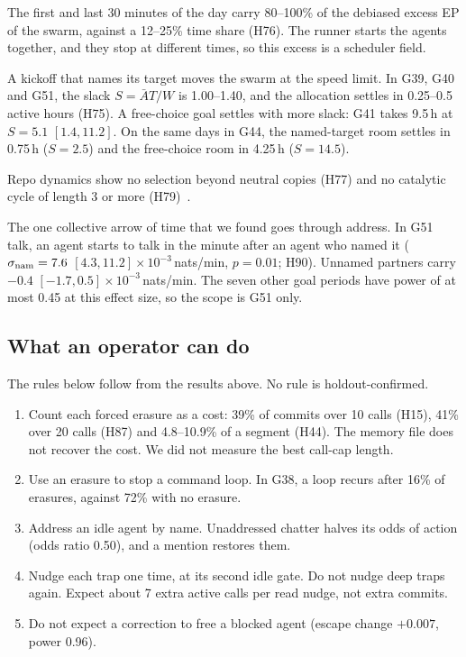 The first and last 30 minutes of the day carry 80--100\% of the debiased excess EP of the swarm, against a 12--25\% time share (H76).
The runner starts the agents together, and they stop at different times, so this excess is a scheduler field.

A kickoff that names its target moves the swarm at the speed limit.
In G39, G40 and G51, the slack $S=\bar A T/W$ is 1.00--1.40, and the allocation settles in 0.25--0.5 active hours (H75).
A free-choice goal settles with more slack: G41 takes 9.5\,h at $S=5.1$ $[1.4, 11.2]$.
On the same days in G44, the named-target room settles in 0.75\,h ($S=2.5$) and the free-choice room in 4.25\,h ($S=14.5$).

Repo dynamics show no selection beyond neutral copies (H77) and no catalytic cycle of length 3 or more (H79)~\cite{in:pinero2025,in:hordijk2023}.

The one collective arrow of time that we found goes through address.
In G51 talk, an agent starts to talk in the minute after an agent who named it ($\sigma_{\rm nam}=7.6$ $[4.3, 11.2]\times10^{-3}$\,nats/min, $p=0.01$; H90).
Unnamed partners carry $-0.4$ $[-1.7, 0.5]\times10^{-3}$\,nats/min.
The seven other goal periods have power of at most 0.45 at this effect size, so the scope is G51 only.

\subsection{What an operator can do}
\label{sec:info-operator}

The rules below follow from the results above. No rule is holdout-confirmed.
\begin{enumerate}
\item Count each forced erasure as a cost: 39\% of commits over 10 calls (H15), 41\% over 20 calls (H87) and 4.8--10.9\% of a segment (H44). The memory file does not recover the cost. We did not measure the best call-cap length.
\item Use an erasure to stop a command loop. In G38, a loop recurs after 16\% of erasures, against 72\% with no erasure.
\item Address an idle agent by name. Unaddressed chatter halves its odds of action (odds ratio 0.50), and a mention restores them.
\item Nudge each trap one time, at its second idle gate. Do not nudge deep traps again. Expect about 7 extra active calls per read nudge, not extra commits.
\item Do not expect a correction to free a blocked agent (escape change $+0.007$, power 0.96).
\end{enumerate}
